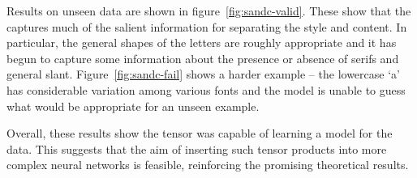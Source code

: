 Results on unseen data are shown in figure~\ref{fig:sandc-valid}. These show that the captures
much of the salient information for separating the style and content. In
particular, the general shapes of the letters are roughly appropriate and it has begun to capture
some information about the presence or absence of serifs and general slant.
Figure~\ref{fig:sandc-fail} shows a harder example -- the lowercase `a' has considerable variation
among various fonts and the model is unable to guess what would be appropriate for an unseen
example. 

Overall, these results show the tensor was capable of learning a model for the data.
This suggests that the aim of inserting such tensor products into more complex neural networks
is feasible, reinforcing the promising theoretical results.


